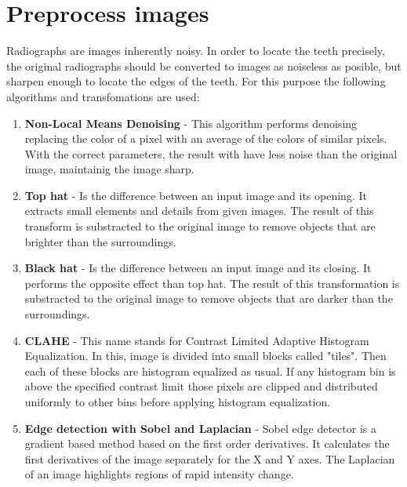 \section{Preprocess images}

Radiographs are images inherently noisy. In order to locate
the teeth precisely, the original radiographs should be
converted to images as noiseless as posible, but sharpen
enough to locate the edges of the teeth. For this purpose
the following algorithms and transfomations are used:

\begin{enumerate}
  \item \textbf{Non-Local Means Denoising} - This algorithm
  performs denoising replacing the color of a pixel with
  an average of the colors of similar pixels. With the correct
  parameters, the result with have less noise than the original
  image, maintainig the image sharp.
\item \textbf{Top hat} - Is the difference between an input
  image and its opening. It extracts small elements and details
  from given images. The result of this transform is substracted
  to the original image to remove objects that are brighter than
  the surroundings.
\item \textbf{Black hat} - Is the difference between an input
  image and its closing. It performs the opposite effect than
  top hat. The result of this transformation is substracted to
  the original image to remove objects that are darker than the
  surroundings.
\item \textbf{CLAHE} - This name stands for Contrast Limited
  Adaptive Histogram Equalization. In this, image is divided
  into small blocks called "tiles". Then each of these blocks
  are histogram equalized as usual. If any histogram bin is
  above the specified contrast limit those pixels are clipped
  and distributed uniformly to other bins before applying
  histogram equalization.
\item \textbf{Edge detection with Sobel and Laplacian} - Sobel
  edge detector is a gradient based method based on the first
  order derivatives. It calculates the first derivatives of
  the image separately for the X and Y axes. The Laplacian of
  an image highlights regions of rapid intensity change.
\end{enumerate}

